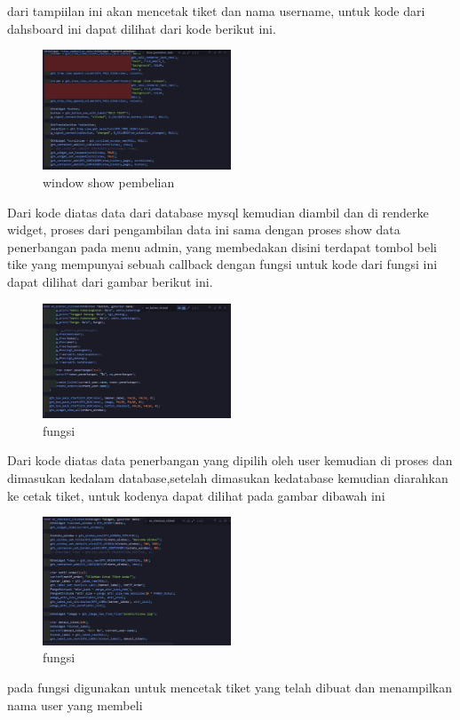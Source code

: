 \documentclass[a4paper,12pt]{article}
\begin{document}
\FloatBarrier
dari tampiilan ini akan mencetak tiket dan nama username, untuk kode dari dahsboard ini dapat dilihat dari kode berikut ini.
\begin{figure}[!htbp]
    \centering
    \includegraphics[width=0.5\textwidth]{./img/widget_pembelian.png}
    \caption{window show pembelian}
\end{figure}
\FloatBarrier
Dari kode diatas data dari database mysql kemudian diambil dan di renderke widget, proses dari pengambilan data ini sama dengan proses show data penerbangan pada menu admin,
yang membedakan disini terdapat tombol beli tike yang mempunyai sebuah callback dengan fungsi \texttt{}
untuk kode dari fungsi ini dapat dilihat dari gambar berikut ini.
\begin{figure}[!htbp]
    \centering
    \includegraphics[width=0.5\textwidth]{./img/checkout_button.png}
    \caption{fungsi \texttt{}}
\end{figure}
\FloatBarrier
Dari kode diatas data penerbangan yang dipilih oleh user kemudian di proses dan dimasukan kedalam database,setelah dimasukan kedatabase kemudian diarahkan ke cetak tiket, untuk kodenya dapat 
dilihat pada gambar dibawah ini
\begin{figure}[!htbp]
    \centering
    \includegraphics[width=0.5\textwidth]{./img/cetak_tiket.png}
    \caption{fungsi \texttt{}}
\end{figure}
\FloatBarrier
pada fungsi \texttt{} digunakan untuk mencetak tiket yang telah dibuat dan menampilkan nama user yang membeli
\end{document}
